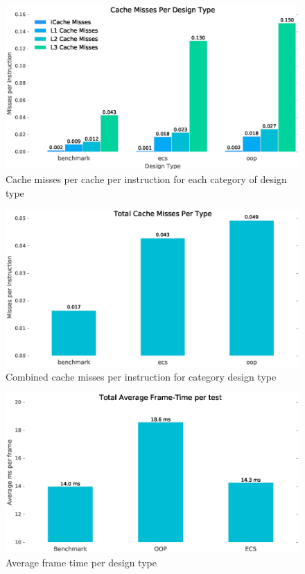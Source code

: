 \documentclass[10pt]{scrartcl}
\begin{document}
	\begin{figure}[H]
		\centering
		\includegraphics[width=\textwidth]{profiling/designs.eps}
		\caption{Cache misses per cache per instruction for each category of design type}
		\label{fig:system_misses}
	\end{figure}

	\begin{figure}[H]
		\centering
		\includegraphics[width=\textwidth]{profiling/combined.eps}
		\caption{Combined cache misses per instruction for category design type}
		\label{fig:combined_misses}
	\end{figure}

	\begin{figure}[H]
		\centering
		\includegraphics[width=\textwidth]{profiling/total_averages.eps}
		\caption{Average frame time per design type}
		\label{fig:frame_averages}
	\end{figure}
\end{document}

